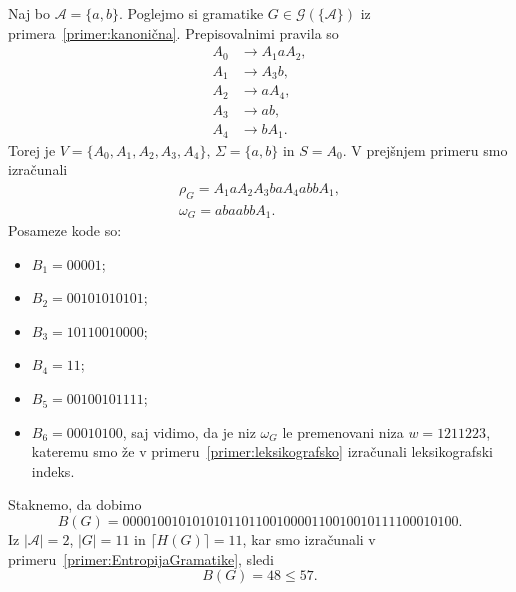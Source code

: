 \documentclass[fin1, tisk]{fmfdelo}
\providecommand{\abs}[1]{\left\lvert #1 \right\rvert}
\newcommand{\A}{\mathcal{A}}
\newcommand{\G}{\mathcal{G}}
\theoremstyle{definition}
\begin{document}
\begin{primer}
    Naj bo $\A = \{ a, b\}$. Poglejmo si gramatike $G \in \G(\{ \A \})$ iz primera~\ref{primer:kanonična}.
    Prepisovalnimi pravila so
    \begin{align*}
        A_0 &\rightarrow A_1aA_2, \\
        A_1 &\rightarrow A_3b, \\
        A_2 &\rightarrow aA_4, \\
        A_3 &\rightarrow ab, \\
        A_4 &\rightarrow bA_1.
    \end{align*}
    Torej je $V = \{ A_0, A_1, A_2, A_3, A_4 \}$, $\Sigma  = \{ a, b \}$ in $S=A_0$. V prejšnjem 
    primeru smo izračunali
    \begin{gather*}
        \rho_G = A_1aA_2A_3baA_4abbA_1, \\
        \omega_G = abaabbA_1.
    \end{gather*}
    Posameze kode so:
    \begin{itemize}
        \item $B_1 = 00001$;
        \item $B_2 = 00101010101$;
        \item $B_3 = 10110010000$;
        \item $B_4 = 11$;
        \item $B_5 = 00100101111$;
        \item $B_6 = 00010100$, saj vidimo, da je niz $\omega_G$ le premenovani niza $w = 1211223$,
        kateremu smo že v primeru~\ref{primer:leksikografsko} izračunali leksikografski indeks.
    \end{itemize}
    Staknemo, da dobimo
    \[
        B(G) = 00001 00101010101 10110010000 11 00100101111 00010100.
    \]
    Iz $\abs{\A} = 2$, $\abs{G} = 11$ in $\lceil H(G) \rceil = 11$, kar smo izračunali v 
    primeru~\ref{primer:EntropijaGramatike}, sledi
    \[
        B(G) = 48 \leq 57.
    \]


\end{primer}
\end{document}
